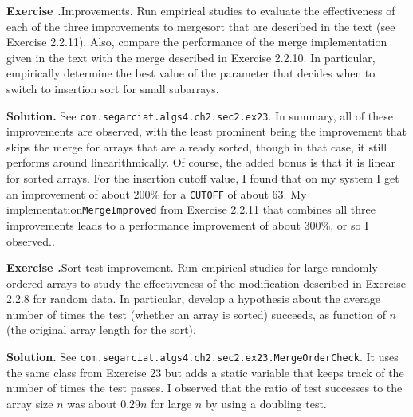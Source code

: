 \documentclass[12pt, a4paper]{article}
\newenvironment{ex}[2][Exercise]
{\par\medskip\noindent \textbf{#1 #2.}}
{\medskip}
\newenvironment{sol}[1][Solution]
{\par\medskip\noindent \textbf{#1.} }
{\medskip}
\begin{document}
	\begin{ex}{23}
		\emph{Improvements}. Run empirical studies to evaluate the effectiveness of each of the
		three improvements to mergesort that are described in the text (see Exercise 2.2.11).
		Also, compare the performance of the merge implementation given in the text with the
		merge described in Exercise 2.2.10. In particular, empirically determine the best value
		of the parameter that decides when to switch to insertion sort for small subarrays.
	\end{ex}
	\begin{sol}
		See \texttt{com.segarciat.algs4.ch2.sec2.ex23}. In summary, all of these improvements
		are observed, with the least prominent being the improvement that skips the
		merge for arrays that are already sorted, though in that case, it still
		performs around linearithmically. Of course, the added bonus is that it is
		linear for sorted arrays. For the insertion cutoff value, I found that on my
		system I get an improvement of about $200\%$ for a \texttt{CUTOFF} of about $63$.
		My implementation\texttt{MergeImproved} from Exercise 2.2.11 that combines all
		three improvements leads to a performance improvement of about $300\%$, or so
		I observed..
	\end{sol}
	\begin{ex}{24}
		\emph{Sort-test improvement}. Run empirical studies for large randomly ordered arrays
		to study the effectiveness  of the modification described in Exercise 2.2.8  for random
		data. In particular, develop a hypothesis about the average number of times the
		test (whether an array is sorted) succeeds, as function of $n$ (the original array
		length for the sort).
	\end{ex}
	\begin{sol}
		See \texttt{com.segarciat.algs4.ch2.sec2.ex23.MergeOrderCheck}. It uses the
		same class from Exercise 23 but adds a static variable that keeps track of
		the number of times the test passes. I observed that the ratio of test successes
		to the array size $n$ was about $0.29n$ for large $n$ by using a doubling test.
	\end{sol}
	\pagebreak
	\printbibliography
\end{document}
